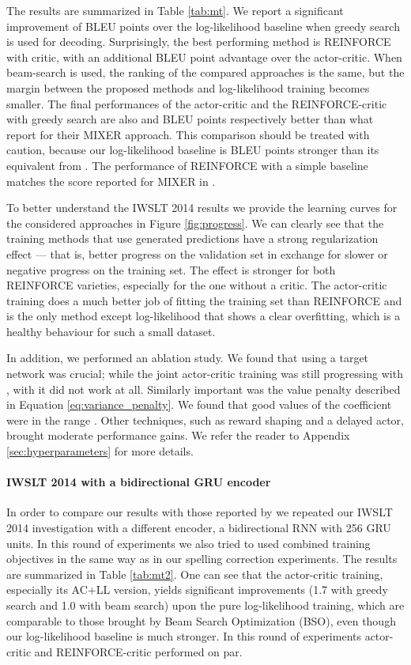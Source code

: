 \documentclass{article} \usepackage{iclr2017_conference,times}
\begin{document}
The results are summarized in Table \ref{tab:mt}. We report
a significant improvement of  BLEU points over the log-likelihood baseline
when greedy search is used for decoding. Surprisingly, the best performing method
is REINFORCE with critic, with an additional  BLEU point advantage
over the actor-critic. When beam-search is used, the ranking of the compared approaches
is the same, but the margin between the proposed methods and log-likelihood training
becomes smaller.  The final performances of the actor-critic and the
REINFORCE-critic with greedy search are also  and  BLEU points
respectively better than what \citet{ranzato2015sequence} report for their
MIXER approach.  This comparison should be treated with caution,
because our log-likelihood baseline is  BLEU points stronger
than its equivalent from \citep{ranzato2015sequence}. The performance
of REINFORCE with a simple baseline matches the score reported for MIXER in
\citet{ranzato2015sequence}.

To better understand the IWSLT 2014 results we provide
the learning curves for the considered approaches in Figure
\ref{fig:progress}. We can clearly see that the training methods that use
generated predictions have a strong regularization effect --- that is, better
progress on the validation set in exchange for slower or negative progress on
the training set. The effect is stronger for both REINFORCE varieties, 
especially for the one without a critic. The actor-critic training does a 
much better job of fitting the training set than REINFORCE and is the only
method except log-likelihood that shows a clear overfitting, which is a healthy 
behaviour for such a small dataset.

In addition, we performed an ablation study.  We found that using a target network was crucial;  while
the joint actor-critic training was still progressing with , 
with  it did not work at all. Similarly
important was the value penalty described in Equation
\eqref{eq:variance_penalty}. We found that good values of the  coefficient
were in the range .  Other
techniques, such as reward shaping and a delayed actor, brought moderate
performance gains. We refer the reader to Appendix \ref{sec:hyperparameters} for more details.

\paragraph{IWSLT 2014 with a bidirectional GRU encoder}
In order to compare our results with those reported by
\citet{wiseman2016sequence} we repeated our IWSLT 2014 investigation with a
different encoder, a bidirectional RNN with 256 GRU units. In this round of
experiments we also tried to used combined training objectives in the same way as in
our spelling correction experiments. The results are summarized in Table \ref{tab:mt2}.
One can see that the actor-critic training, especially its AC+LL version, yields significant improvements (1.7 with greedy search and 1.0 with beam search) upon the pure log-likelihood training, which are comparable to those brought by Beam Search Optimization (BSO), even though our log-likelihood baseline is much stronger. In this round of experiments actor-critic and REINFORCE-critic performed on par.
\end{document}
